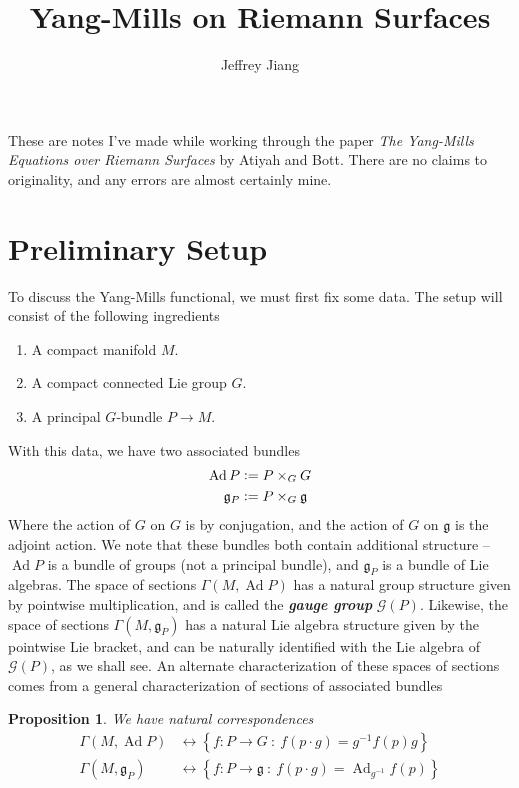 \documentclass[psamsfonts, 12pt]{amsart}
\newtheorem{prop}[thm]{Proposition}
\theoremstyle{definition}
\theoremstyle{remark}
\newcommand{\ib}[1]{\textbf{\textit{#1}}}
\newcommand{\g}{\mathfrak{g}}
\newcommand{\inv}{^{-1}}
\newcommand{\set}[1]{\left\lbrace #1 \right\rbrace}
\newcommand{\defeq}{\vcentcolon=}
\DeclareMathOperator{\Ad}{Ad}
\begin{document}
%
\author{Jeffrey Jiang}
%
\title{Yang-Mills on Riemann Surfaces}
%
\maketitle
%
These are notes I've made while working through the paper \emph{The Yang-Mills
Equations over Riemann Surfaces} \cite{10.2307/37156} by Atiyah and Bott. There
are no claims to originality, and any errors are almost certainly mine.
%
\tableofcontents
%
\section{Preliminary Setup}
%
To discuss the Yang-Mills functional, we must first fix some data. The setup will
consist of the following ingredients
\begin{enumerate}
  \item A compact manifold $M$.
  \item A compact connected Lie group $G$.
  \item A principal $G$-bundle $P \to M$.
\end{enumerate}
%
With this data, we have two associated bundles
\begin{align*}
\Ad P &\defeq P \times_G G \\
\g_P &\defeq P \times_G \g
\end{align*}
%
Where the action of $G$ on $G$ is by conjugation, and the action of $G$ on $\g$
is the adjoint action. We note that these bundles both contain additional structure --
$\Ad P$ is a bundle of groups (not a principal bundle), and $\g_P$ is a bundle of Lie
algebras. The space of sections $\Gamma(M, \Ad P)$ has
a natural group structure given by pointwise multiplication, and is called the
\ib{gauge group} $\mathscr{G}(P)$. Likewise, the space of sections
$\Gamma(M, \g_P)$ has a natural Lie algebra structure given by the pointwise Lie
bracket, and can be naturally identified with the Lie algebra of $\mathscr{G}(P)$,
as we shall see. An alternate characterization of these spaces of sections comes from
a general characterization of sections of associated bundles
%
\begin{prop}
We have natural correspondences
\begin{align*}
\Gamma(M, \Ad P) &\longleftrightarrow \set{f : P \to G ~:~ f(p\cdot g) = g\inv f(p)g} \\
\Gamma(M, \g_P) &\longleftrightarrow \set{f : P \to \g ~:~ f(p\cdot g) = \Ad_{g\inv}f(p)}
\end{align*}
\end{prop}
\end{document}
